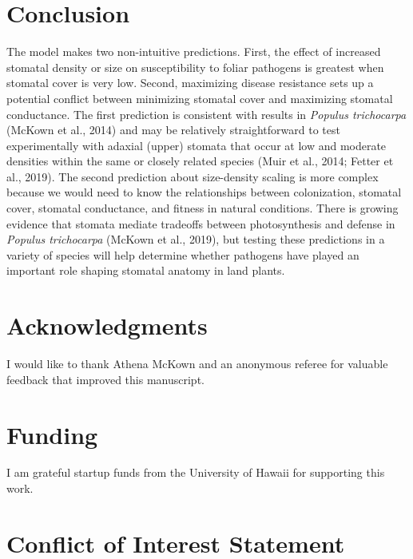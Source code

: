 \documentclass[utf8]{frontiersSCNS}
\begin{document}
\hypertarget{conclusion}{%
\section*{Conclusion}\label{conclusion}}

The model makes two non-intuitive predictions. First, the effect of
increased stomatal density or size on susceptibility to foliar pathogens
is greatest when stomatal cover is very low. Second, maximizing disease
resistance sets up a potential conflict between minimizing stomatal
cover and maximizing stomatal conductance. The first prediction is
consistent with results in \emph{Populus trichocarpa} (McKown et al.,
2014) and may be relatively straightforward to test experimentally with
adaxial (upper) stomata that occur at low and moderate densities within
the same or closely related species (Muir et al., 2014; Fetter et al.,
2019). The second prediction about size-density scaling is more complex
because we would need to know the relationships between colonization,
stomatal cover, stomatal conductance, and fitness in natural conditions.
There is growing evidence that stomata mediate tradeoffs between
photosynthesis and defense in \emph{Populus trichocarpa} (McKown et al.,
2019), but testing these predictions in a variety of species will help
determine whether pathogens have played an important role shaping
stomatal anatomy in land plants.

\hypertarget{acknowledgments}{%
\section*{Acknowledgments}\label{acknowledgments}}

I would like to thank Athena McKown and an anonymous referee for
valuable feedback that improved this manuscript.

\hypertarget{funding}{%
\section*{Funding}\label{funding}}

I am grateful startup funds from the University of Hawaii for supporting
this work.

\hypertarget{conflict-of-interest-statement}{%
\section*{Conflict of Interest
Statement}\label{conflict-of-interest-statement}}
\end{document}

